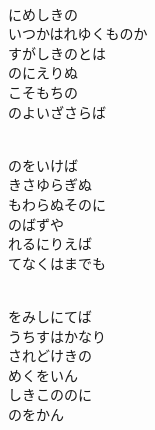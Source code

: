 \documentclass[10pt,b5j]{tarticle} %
\begin{document}
\vspace{1.5em} %
\newcommand{\linespace}{0.5em} %
\newcommand{\blocksize}{0.5\hsize} %
\newcommand{\itemmargin}{6em} %
\begin{enumerate} %
    \setlength{\itemindent}{\itemmargin} %
    \begin{minipage}[c]{\blocksize}
    
        \vspace{\linespace}
        \item~\\
        にめしきの\\
        いつかはれゆくものか\\
        すがしきのとは\\
        のにえりぬ\\
        こそもちの\\
        のよいざさらば
        
        \vspace{\linespace}
        \item~\\
        のをいけば\\
        きさゆらぎぬ\\
        もわらぬそのに\\
        のばずや\\
        れるにりえば\\
        てなくはまでも
        
        \vspace{\linespace}
        \item~\\
        をみしにてば\\
        うちすはかなり\\
        されどけきの\\
        めくをいん\\
        しきこののに\\
        のをかん
    
    \end{minipage}
\end{enumerate} %
\end{document}
